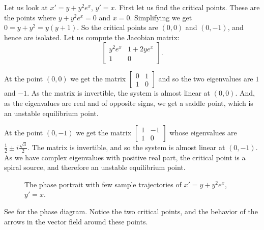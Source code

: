 \documentclass[12pt]{book}
\begin{document}
\begin{example} \label{example:nlin-withexp}
Let us look at
$x'=y+y^2e^x$,
$y'=x$.  First let us find the critical points.  These are the points where
$y+y^2e^x = 0$ and $x=0$.  Simplifying we get $0=y+y^2 = y(y+1)$.  So the
critical points are $(0,0)$ and $(0,-1)$, and hence are isolated.  Let us
compute the Jacobian matrix:
\begin{equation*}
\begin{bmatrix}
y^2e^x & 1+2ye^x \\
1 & 0
\end{bmatrix}.
\end{equation*}

At the point $(0,0)$ we get the matrix
$\left[ \begin{smallmatrix} 0 & 1 \\ 1 & 0 \end{smallmatrix} \right]$ and
so the two eigenvalues are $1$ and $-1$.  As the matrix is invertible, the system is almost linear
at $(0,0)$.  And, as the eigenvalues are real
and of opposite signs, we get a saddle point, which is an unstable
equilibrium point.

At the point $(0,-1)$ we get the matrix
$\left[ \begin{smallmatrix} 1 & -1 \\ 1 & 0 \end{smallmatrix} \right]$ whose
eigenvalues are $\frac{1}{2} \pm i \frac{\sqrt{3}}{2}$.
The matrix is invertible, and so the system is almost linear at $(0,-1)$.
As we have complex eigenvalues with positive real part, the critical
point is a spiral source, and therefore an unstable equilibrium point.

\begin{figure}[h!t]
\capstart
\begin{center}
\caption{The phase portrait with few sample trajectories of 
$x'=y+y^2e^x$, $y'=x$.  \label{fig:nlin-ex813}}
\end{center}
\end{figure}

See  for the phase diagram.  Notice the two
critical points, and the behavior of the arrows in the vector field around
these points.
\end{example}
\end{document}
